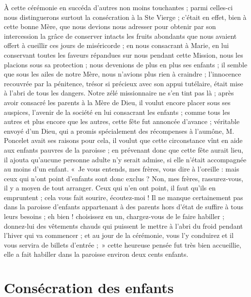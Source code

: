 \documentclass[11pt,a4paper]{report}
\begin{document}
À cette cérémonie en succéda d'autres non moins touchantes ; parmi celles-ci nous distinguerons surtout la consécration à la Ste Vierge ; c'était en effet, bien à cette bonne Mère, que nous devions nous adresser pour obtenir par son intercession la grâce de conserver intacts les fruits abondants que nous avaient offert à cueillir ces jours de miséricorde ; en nous consacrant à Marie, en lui conservant toutes les faveurs répandues sur nous pendant cette Mission, nous les placions sous sa protection ; nous devenions de plus en plus ses enfants ; il semble que sous les ailes de notre Mère, nous n'avions plus rien à craindre ; l'innocence recouvrée par la pénitence, trésor si précieux avec son appui tutélaire, était mise à l'abri de tous les dangers. Notre zélé missionnaire ne s'en tint pas là ; après avoir consacré les parents à la Mère de Dieu, il voulut encore placer sous ses auspices, l'avenir de la société en lui consacrant les enfants ; comme tous les autres et plus encore que les autres, cette fête fut annoncée d'avance ; véritable envoyé d'un Dieu, qui a promis spécialement des récompenses à l'aumône, M. Poncelet avait ses raisons pour cela, il voulut que cette circonstance vînt en aide aux enfants pauvres de la paroisse ; en prévenant donc que cette fête aurait lieu, il ajouta qu'aucune personne adulte n'y serait admise, si elle n'était accompagnée au moins d'un enfant. «~Je vous entends, mes frères, vous dire à l'oreille : mais ceux qui n'ont point d'enfants sont donc exclus ? Non, mes frères, rassurez-vous, il y a moyen de tout arranger. Ceux qui n'en ont point, il faut qu'ils en empruntent ; cela vous fait sourire, écoutez-moi ! Il ne manque certainement pas dans la paroisse d'enfants appartenant à des parents hors d'état de suffire à tous leurs besoins ; eh bien ! choisissez en un, chargez-vous de le faire habiller ; donnez-lui des vêtements chauds qui puissent le mettre à l'abri du froid pendant l'hiver qui va commencer ; et au jour de la cérémonie, vous l'y conduirez et il vous servira de billets d'entrée ;~» cette heureuse pensée fut très bien accueillie, elle a fait habiller dans la paroisse environ deux cents enfants.

\section*{Consécration des enfants}
\end{document}
